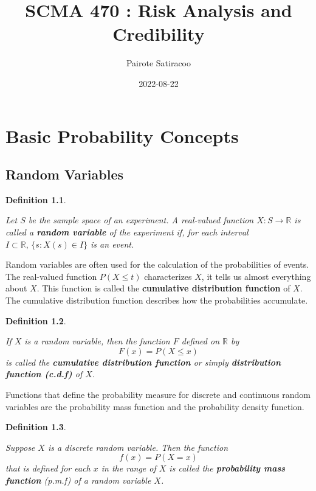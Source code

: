 \documentclass[landscape, 20pt]{extreport}
\title{\textbf{SCMA 470 : Risk Analysis and Credibility}}
\author{Pairote Satiracoo}
\date{2022-08-22}
\theoremstyle{definition}
\newtheorem{definition}{Definition}[chapter]
\theoremstyle{definition}
\theoremstyle{definition}
\theoremstyle{definition}
\theoremstyle{remark}
\begin{document}
\maketitle

{
\setcounter{tocdepth}{1}
}
\hypertarget{basic-probability-concepts}{%
\chapter{Basic Probability Concepts}\label{basic-probability-concepts}}

\hypertarget{random-variables}{%
\section{Random Variables}\label{random-variables}}

\begin{definition}
\protect\hypertarget{def:unlabeled-div-1}{}\label{def:unlabeled-div-1}

\emph{Let \(S\) be the sample space of an experiment. A
real-valued function \(X : S \rightarrow \mathbb{R}\) is called a \textbf{random
variable} of the experiment if, for each interval
\(I \subset \mathbb{R}, \, \{s : X(s) \in I \}\) is an event. }

\end{definition}

Random variables are often used for the calculation of the probabilities
of events. The real-valued function \(P(X \le t)\) characterizes \(X\), it
tells us almost everything about \(X\). This function is called the
\textbf{cumulative distribution function} of \(X\). The cumulative distribution
function describes how the probabilities accumulate.

\begin{definition}
\protect\hypertarget{def:unlabeled-div-2}{}\label{def:unlabeled-div-2}

\emph{If \(X\) is a random variable, then the function \(F\)
defined on \(\mathbb{R}\) by \[F(x) = P(X \le x)\] is called the
\textbf{cumulative distribution function} or simply \textbf{distribution function
(c.d.f)} of \(X\).}

\end{definition}

Functions that define the probability measure for discrete and
continuous random variables are the probability mass function and the
probability density function.

\begin{definition}
\protect\hypertarget{def:unlabeled-div-3}{}\label{def:unlabeled-div-3}

\emph{Suppose \(X\) is a discrete random variable. Then the
function \[f(x) = P(X = x)\] that is defined for each \(x\) in the range
of \(X\) is called the \textbf{probability mass function} (p.m.f) of a random
variable \(X\).}

\end{definition}
\end{document}
